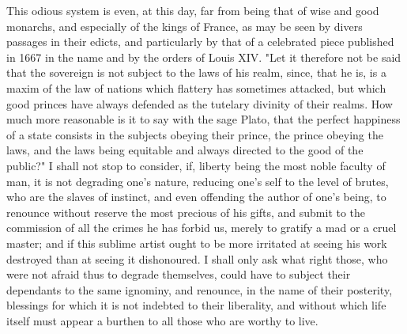\documentclass[11pt,twocolumn]{ltugboat}
\begin{document}
This odious system is even, at this day, far from being that of wise
and good monarchs, and especially of the kings of France, as may be
seen by divers passages in their edicts, and particularly by that of a
celebrated piece published in 1667 in the name and by the orders of
Louis XIV. "Let it therefore not be said that the sovereign is not
subject to the laws of his realm, since, that he is, is a maxim of the
law of nations which flattery has sometimes attacked, but which good
princes have always defended as the tutelary divinity of their realms.
How much more reasonable is it to say with the sage Plato, that the
perfect happiness of a state consists in the subjects obeying their
prince, the prince obeying the laws, and the laws being equitable and
always directed to the good of the public?" I shall not stop to
consider, if, liberty being the most noble faculty of man, it is not
degrading one's nature, reducing one's self to the level of brutes,
who are the slaves of instinct, and even offending the author of one's
being, to renounce without reserve the most precious of his gifts, and
submit to the commission of all the crimes he has forbid us, merely to
gratify a mad or a cruel master; and if this sublime artist ought to
be more irritated at seeing his work destroyed than at seeing it
dishonoured. I shall only ask what right those, who were not afraid
thus to degrade themselves, could have to subject their dependants to
the same ignominy, and renounce, in the name of their posterity,
blessings for which it is not indebted to their liberality, and
without which life itself must appear a burthen to all those who are
worthy to live.
\end{document}
